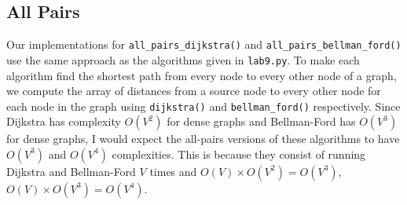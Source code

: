 \documentclass[12pt]{article}
\begin{document}
\subsection{All Pairs}
Our implementations for \verb+all_pairs_dijkstra()+ and \verb+all_pairs_bellman_ford()+ use the same approach as the algorithms given in \verb+lab9.py+. To make each algorithm find the shortest path from every node to every other node of a graph, we compute the array of distances from a source node to every other node for each node in the graph using \verb+dijkstra()+ and \verb+bellman_ford()+ respectively. Since Dijkstra has complexity $O(V^2)$ for dense graphs and Bellman-Ford has $O(V^3)$
for dense graphs, I would expect the all-pairs versions of these algorithms to have $O(V^3)$ and $O(V^4)$ complexities. This is because they consist of running Dijkstra and Bellman-Ford $V$ times and $O(V)\times O(V^2)=O(V^3)$, $O(V)\times O(V^3)=O(V^4)$.
\end{document}
